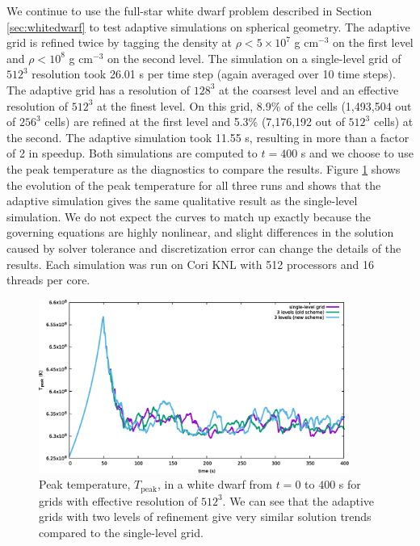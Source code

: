 We continue to use the full-star white dwarf problem described in Section \ref{sec:whitedwarf} to test adaptive simulations on spherical geometry. The adaptive grid is refined twice by tagging the density at $\rho < 5\times 10^7$ g cm$^{-3}$ on the first level and $\rho < 10^8$ g cm$^{-3}$ on the second level. The simulation on a single-level grid of $512^3$ resolution took 26.01 s per time step (again averaged over 10 time steps).  The adaptive grid has a resolution of $128^3$ at the coarsest level and an effective resolution of $512^3$ at the finest level. On this grid, 8.9\% of the cells (1,493,504 out of $256^3$ cells) are refined at the first level and 5.3\% (7,176,192 out of $512^3$ cells) at the second. The adaptive simulation took 11.55 s, resulting in more than a factor of 2 in speedup. Both simulations are computed to $t=400$ s and we choose to use the peak temperature as the diagnostics to compare the results. Figure \ref{fig:wdconvect_amr_Tmax} shows the evolution of the peak temperature for all three runs and shows that the adaptive simulation gives the same qualitative result as the single-level simulation. We do not expect the curves to match up exactly because the governing equations are highly nonlinear, and slight differences in the solution caused by solver tolerance and discretization error can change the details of the results. Each simulation was run on Cori KNL with 512 processors and 16 threads per core.

\begin{figure}[htb]
\begin{center}
\includegraphics[width=4.0in]{./figs/wdconvect_amr_Tmax} 
\caption{\label{fig:wdconvect_amr_Tmax} Peak temperature, $T_{\text{peak}}$, in a white dwarf from $t=0$ to $400$ s 
         for grids with effective resolution of $512^3$. We can see that the adaptive grids with two levels of 
         refinement give very similar solution trends compared to the single-level grid.}
\end{center}
\end{figure}


